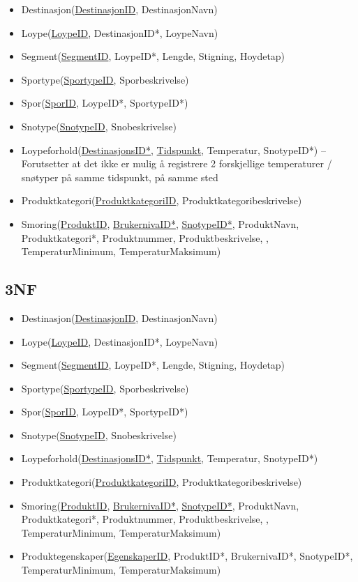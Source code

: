 \documentclass[12pt, a4paper]{article}
\begin{document}
\begin{itemize}
	\item Destinasjon(\underline{DestinasjonID}, DestinasjonNavn)
	\item Loype(\underline{LoypeID}, DestinasjonID*, LoypeNavn) 
	\item Segment(\underline{SegmentID}, LoypeID*, Lengde, Stigning, Hoydetap) 
	\item Sportype(\underline{SportypeID}, Sporbeskrivelse)
	\item Spor(\underline{SporID}, LoypeID*, SportypeID*)
	\item Snotype(\underline{SnotypeID}, Snobeskrivelse) 
	\item Loypeforhold(\underline{DestinasjonsID*}, \underline{Tidspunkt}, Temperatur, SnotypeID*) -- Forutsetter at det ikke er mulig å registrere 2 forskjellige temperaturer / snøtyper på samme tidspunkt, på samme sted
	\item Produktkategori(\underline{ProduktkategoriID}, Produktkategoribeskrivelse) 
	\item Smoring(\underline{ProduktID}, \underline{BrukernivaID*}, \underline{SnotypeID*}, ProduktNavn, Produktkategori*, Produktnummer, Produktbeskrivelse, , TemperaturMinimum, TemperaturMaksimum) 
\end{itemize}

\subsection{3NF}

\begin{itemize}
	\item Destinasjon(\underline{DestinasjonID}, DestinasjonNavn)
	\item Loype(\underline{LoypeID}, DestinasjonID*, LoypeNavn) 
	\item Segment(\underline{SegmentID}, LoypeID*, Lengde, Stigning, Hoydetap) 
	\item Sportype(\underline{SportypeID}, Sporbeskrivelse)
	\item Spor(\underline{SporID}, LoypeID*, SportypeID*)
	\item Snotype(\underline{SnotypeID}, Snobeskrivelse) 
	\item Loypeforhold(\underline{DestinasjonsID*}, \underline{Tidspunkt}, Temperatur, SnotypeID*) 
	\item Produktkategori(\underline{ProduktkategoriID}, Produktkategoribeskrivelse) 
	\item Smoring(\underline{ProduktID}, \underline{BrukernivaID*}, \underline{SnotypeID*}, ProduktNavn, Produktkategori*, Produktnummer, Produktbeskrivelse, , TemperaturMinimum, TemperaturMaksimum)
	\item Produktegenskaper(\underline{EgenskaperID}, ProduktID*, BrukernivaID*, SnotypeID*, TemperaturMinimum, TemperaturMaksimum)
\end{itemize}
\end{document}
